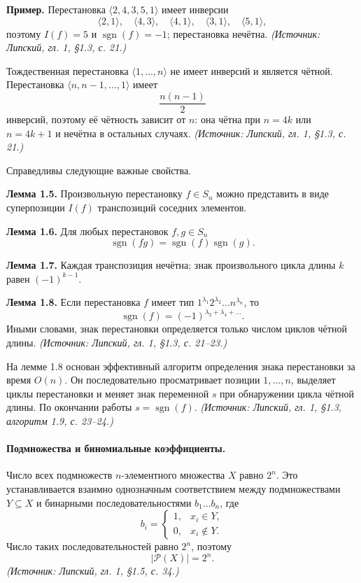 \documentclass[a4paper,12pt]{article}
\begin{document}
\textbf{Пример.} Перестановка \(\langle 2,4,3,5,1\rangle\) имеет инверсии
\[
\langle 2,1\rangle,\quad \langle 4,3\rangle,\quad \langle 4,1\rangle,\quad \langle 3,1\rangle,\quad \langle 5,1\rangle,
\]
поэтому \(I(f)=5\) и \(\operatorname{sgn}(f)=-1\); перестановка нечётна.
\textit{(Источник: Липский, гл. 1, §1.3, с. 21.)}

Тождественная перестановка \(\langle 1,\dots,n\rangle\) не имеет инверсий и является чётной. Перестановка \(\langle n,n-1,\dots,1\rangle\) имеет
\[
\frac{n(n-1)}2
\]
инверсий, поэтому её чётность зависит от \(n\): она чётна при \(n=4k\) или \(n=4k+1\) и нечётна в остальных случаях.
\textit{(Источник: Липский, гл. 1, §1.3, с. 21.)}

Справедливы следующие важные свойства.

\textbf{Лемма 1.5.} Произвольную перестановку \(f\in S_n\) можно представить в виде суперпозиции \(I(f)\) транспозиций соседних элементов.

\textbf{Лемма 1.6.} Для любых перестановок \(f,g\in S_n\)
\[
\operatorname{sgn}(fg)=\operatorname{sgn}(f)\operatorname{sgn}(g).
\]

\textbf{Лемма 1.7.} Каждая транспозиция нечётна; знак произвольного цикла длины \(k\) равен \((-1)^{k-1}\).

\textbf{Лемма 1.8.} Если перестановка \(f\) имеет тип \(1^{\lambda_1}2^{\lambda_2}\dots n^{\lambda_n}\), то
\[
\operatorname{sgn}(f)=(-1)^{\lambda_2+\lambda_4+\dots}.
\]
Иными словами, знак перестановки определяется только числом циклов чётной длины.
\textit{(Источник: Липский, гл. 1, §1.3, с. 21--23.)}

На лемме 1.8 основан эффективный алгоритм определения знака перестановки за время \(O(n)\). Он последовательно просматривает позиции \(1,\dots,n\), выделяет циклы перестановки и меняет знак переменной \(s\) при обнаружении цикла чётной длины. По окончании работы \(s=\operatorname{sgn}(f)\).
\textit{(Источник: Липский, гл. 1, §1.3, алгоритм 1.9, с. 23--24.)}

\paragraph{Подмножества и биномиальные коэффициенты.}
Число всех подмножеств \(n\)-элементного множества \(X\) равно \(2^n\). Это устанавливается взаимно однозначным соответствием между подмножествами \(Y\subseteq X\) и бинарными последовательностями \(b_1\dots b_n\), где
\[
b_i=
\begin{cases}
1, & x_i\in Y,\\
0, & x_i\notin Y.
\end{cases}
\]
Число таких последовательностей равно \(2^n\), поэтому
\[
|\mathcal P(X)|=2^n.
\]
\textit{(Источник: Липский, гл. 1, §1.5, с. 34.)}
\end{document}
